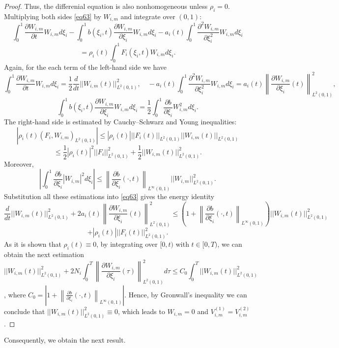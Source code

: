 \documentclass[preprint,12pt,authoryear]{elsarticle}
\begin{document}
\begin{proof}
    Thus, the differenial equation is also nonhomogeneous unless $\rho_i=0$. Multiplying both sides \eqref{eq63} by $W_{i,m}$ and integrate over $(0,1)$:
    $$\int_0^1\frac{\partial W_{i,m}}{\partial t}W_{i,m}d\xi_i-\int_0^1b(\xi_i,t)\frac{\partial W_{i,m}}{\partial \xi_i} W_{i,m}d\xi_i-a_i(t)\int_0^1\frac{\partial^2 W_{i,m}}{\partial\xi_i^2}W_{i,m}d\xi_i$$
    $$=\rho_i(t)\int_0^1F_i(\xi_i,t)W_{i,m}d\xi_i.$$
    Again, for the each term of the left-hand side we have
    $$\int_0^1\frac{\partial W_{i,m}}{\partial t}W_{i,m}d\xi_i=\frac{1}{2}\frac{d}{dt}||W_{i,m}(t)||_{L^2(0,1)}^2,\quad -a_i(t)\int_0^1\frac{\partial^2 W_{i,m}}{\partial\xi_i^2}W_{i,m}d\xi_i=a_i(t)\left\|\frac{\partial W_{i,m}}{\partial\xi_i}(t)\right\|_{L^2(0,1)}^2,$$
    $$\int_0^1b(\xi_i,t)\frac{\partial W_{i,m}}{\partial \xi_i} W_{i,m}d\xi_i=\frac{1}{2}\int_0^1\frac{\partial b}{\partial \xi_i}W_{i,m}^2d\xi_i.$$
    The right-hand side is estimated by Cauchy–Schwarz and Young inequalities:
    $$|\rho_i(t)(F_i,W_{i,m})_{L^2(0,1)}|\leq |\rho_i(t)|||F_i(t)||_{L^{2}(0,1)}||W_{i,m}(t)||_{L^2(0,1)}$$
    $$\leq \frac{1}{2}|\rho_i(t)|^2||F_i||_{L^2(0,1)}^2+\frac{1}{2}||W_{i,m}(t)||_{L^2(0,1)}^2.$$
    Moreover, 
    $$\left|\int_0^1\frac{\partial b}{\partial \xi_i}|W_{i,m}|^2d\xi_i\right|\leq \left\|\frac{\partial b}{\partial \xi_i}(\cdot,t)\right\|_{L^{\infty}(0,1)}||W_{i,m}||_{L^2(0,1)}^2.$$
    Substitution all these estimations into \eqref{eq63} gives the energy identity
    $$\frac{d}{dt}||W_{i,m}(t)||_{L^2(0,1)}^2+2a_i(t)\left\|\frac{\partial W_{i,m}}{\partial\xi_i}(t)\right\|_{L^2(0,1)}^2\leq\left(1+\left\|\frac{\partial b}{\partial \xi_i}(\cdot,t)\right\|_{L^{\infty}(0,1)}\right)||W_{i,m}(t)||_{L^2(0,1)}^2$$
    $$+|\rho_i(t)|||F_i(t)||_{L^2(0,1)}^2.$$
    As it is shown that $\rho_i(t)\equiv 0$, by integrating over $[0,t)$ with $t\in [0,T)$, we can obtain the next estimation
    $$||W_{i,m}(t)||_{L^2(0,1)}^2+2N_i\int_0^T\left\|\frac{\partial W_{i,m}}{\partial\xi_i}(\tau)\right\|_{L^2(0,1)}^2d\tau \leq C_0\int_0^T ||W_{i,m}(t)||_{L^2(0,1)}^2$$,
    where $C_0=\left|1+\left\|\frac{\partial b}{\partial \xi_i}(\cdot,t)\right\|_{L^{\infty}(0,1)}\right|$. Hence, by Gronwall's inequality we can conclude that $||W_{i,m}(t)||_{L^2(0,1)}^2\equiv 0$, which leads to $W_{i,m}=0$ and $V_{i,m}^{(1)}=V_{i,m}^{(2)}$.
\end{proof}
Consequently, we obtain the next result.
\end{document}
